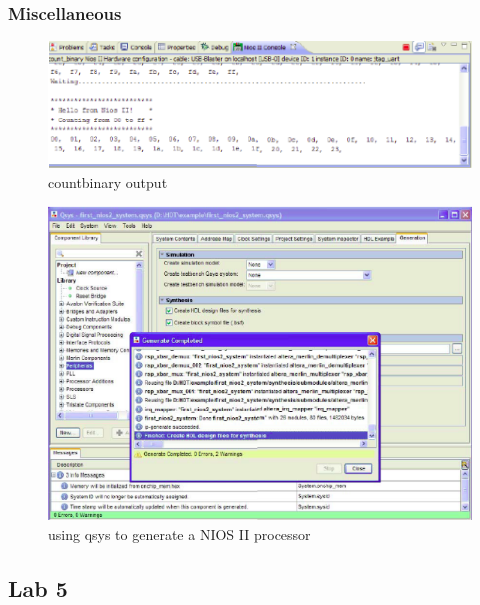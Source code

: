 \documentclass{article}
\begin{document}
    \subsubsection{Miscellaneous}
      \begin{figure}[H]
        \centering
        \includegraphics[width=0.75\linewidth]{figures/countbinary_output.png}
        \caption{countbinary output}
        \label{fig:countbinary_output}
      \end{figure}

      \begin{figure}[H]
        \centering
        \includegraphics[width=0.75\linewidth]{figures/qsys_generate.png}
        \caption{using qsys to generate a NIOS II processor}
        \label{fig:qsys_generate}
      \end{figure}

  \subsection{Lab 5}
\end{document}
